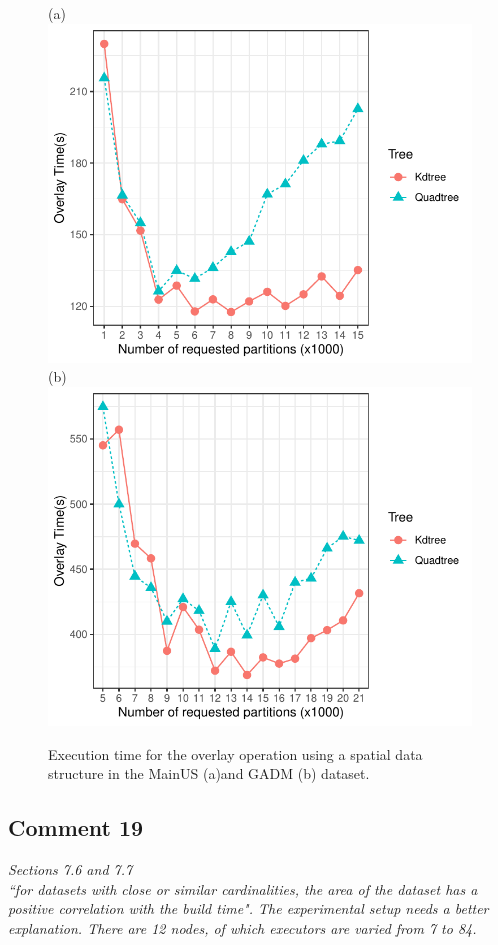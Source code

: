 \documentclass[10pt]{article}
\newcounter{figuremajor}
\newcommand*\setfigurecounter[1]{%
        \setcounter{figuremajor}{#1}%
}
\begin{document}
\setfigurecounter{26}
\begin{figure}[h!]
    \centering
    {\tiny (a)}\includegraphics[width=0.45\linewidth]{figures/K_Overlay_US.pdf}
    {\tiny (b)}\includegraphics[width=0.45\linewidth]{figures/K_Overlay_GADM.pdf}
    \caption{Execution time for the overlay operation using a spatial data structure in the MainUS (a)and GADM (b) dataset.} \label{fig:k_overlay_us}
\end{figure}

\subsection*{Comment 19}
\textit{
Sections 7.6 and 7.7\\
``for datasets with close or similar cardinalities, the area of the dataset has a positive correlation with the build time". The experimental setup needs a better explanation. There are 12 nodes, of which executors are varied from 7 to 84.}
\end{document}
